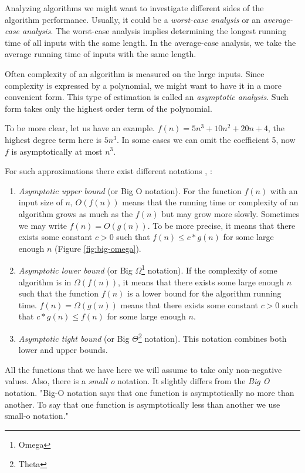 \documentclass[
  field=inf,
  biblatex,
  language=english,
  glossaries,
  theorems=false,
  sourcecodes=false,
  index
]{kidiplom}
\begin{document}
Analyzing algorithms we might want to investigate different sides of the algorithm performance. Usually, it could be a \textit{worst-case analysis} or an \textit{average-case analysis}. The worst-case analysis implies determining the longest running time of all inputs with the same length. In the average-case analysis, we take the average running time of inputs with the same length.

Often complexity of an algorithm is measured on the large inputs. Since complexity is expressed by a polynomial, we might want to have it in a more convenient form. This type of estimation is called an \textit{asymptotic analysis}. Such form takes only the highest order term of the polynomial.

To be more clear, let us have an example. $f(n) = 5n^3 + 10n^2 + 20n + 4$, the highest degree term here is $5n^3$. In some cases we can omit the coefficient 5, now $f$ is asymptotically at most $n^3$.

For such approximations there exist different notations \cite{knuth1}, \cite{sipser}:

\begin{enumerate}
	\item \textit{Asymptotic upper bound} (or Big O notation). For the function $f(n)$ with an input size of $n$, $O(f(n))$ means that the running time or complexity of an algorithm grows as much as the $f(n)$ but may grow more slowly. Sometimes we may write $f(n) = O(g(n))$. To be more precise, it means that there exists some constant $c > 0$ such that $f(n) \leq c * g(n)$ for some large enough $n$ (Figure \ref{fig:big-omega}).
	\item \textit{Asymptotic lower bound} (or Big $\Omega$\footnote{Omega} notation). If the complexity of some algorithm is in $\Omega(f(n))$, it means that there exists some large enough $n$ such that the function $f(n)$ is a lower bound for the algorithm running time. $f(n) = \Omega(g(n))$ means that there exists some constant $c > 0$ such that $c * g(n) \leq f(n)$ for some large enough $n$.
	\item \textit{Asymptotic tight bound} (or Big $\Theta$\footnote{Theta} notation). This notation combines both lower and upper bounds.
\end{enumerate}

All the functions that we have here we will assume to take only non-negative values. Also, there is a \textit{small o} notation. It slightly differs from the \textit{Big O} notation. "Big-O notation says that one function is asymptotically no more than  another. To say that one  function is asymptotically less than another we use small-o notation."\cite{sipser}
\end{document}
